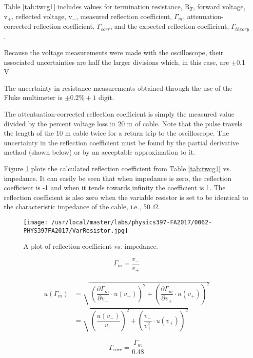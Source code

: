 \begin{enumerate}
Table \ref{tab:twcg1} includes values for termination resistance, R$_T$, forward voltage, v$_+$, reflected voltage, v$_-$, measured reflection coefficient, $\Gamma_m$, attenuation-corrected reflection coefficient, $\Gamma_{corr}$, and the expected reflection coefficient, $\Gamma_{theory}$.

Because the voltage measurements were made with the oscilloscope, their associated uncertainties are half the larger divisions which, in this case, are $\pm$0.1 V.

The uncertainty in resistance measurements obtained through the use of the Fluke multimeter is $\pm0.2\%+ 1$ digit.

The attentuation-corrected reflection coefficient is simply the measured value divided by the percent voltage loss in 20 m of cable. Note that the pulse travels the length of the 10 m cable twice for a return trip to the oscilloscope. The uncertainty in the reflection coefficient must be found by the partial derivative method (shown below) or by an acceptable approximation to it.

Figure \ref{fig:twcg5} plots the calculated reflection coefficient from Table \ref{tab:twcg1} vs. impedance. It can easily be seen that when impedance is zero, the reflection coefficient is -1 and when it tends towards infinity the coefficient is 1. The reflection coefficient is also zero when the variable resistor is set to be identical to the characteristic impedance of the cable, i.e., 50 $\Omega$.

\begin{figure}
\texttt{[image: /usr/local/master/labs/physics397-FA2017/0062-PHYS397FA2017/VarResistor.jpg]}
\caption{A plot of reflection coefficient vs. impedance.}
\label{fig:twcg5}
\end{figure}

\begin{equation}
\Gamma_m=\dfrac{v_-}{v_+}
\label{equ:twcg1}
\end{equation}

\begin{align}
u(\Gamma_m)&=\sqrt{(\dfrac{\partial \Gamma_m}{\partial v_-}\cdot u(v_-))^2+(\dfrac{\partial \Gamma_m}{\partial v_+}\cdot u(v_+))^2}\\
&=\sqrt{(\dfrac{u(v_-)}{v_+})^2+(\dfrac{v_-}{v_+^2}\cdot u(v_+))^2}
\label{equ:twcg2}
\end{align}

\begin{equation}
\Gamma_{corr}=\dfrac{\Gamma_m}{0.48}
\label{equ:twcg3}
\end{equation}


\end{enumerate}
